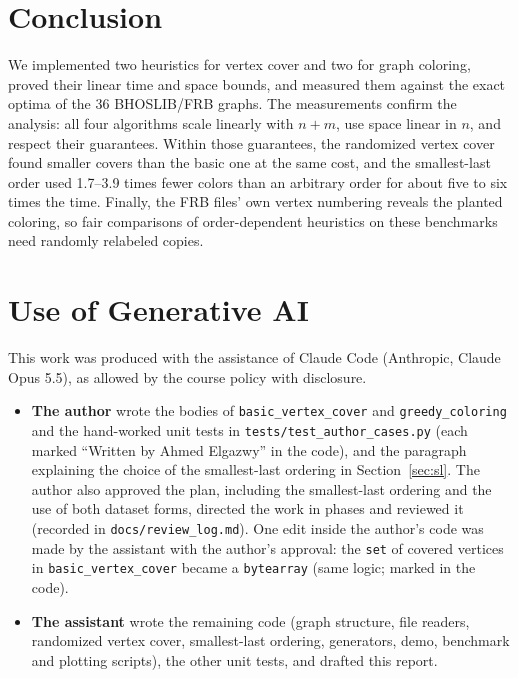 \documentclass[acmsmall,nonacm]{acmart}
\newcommand{\code}[1]{\texttt{#1}}
\begin{document}
\section{Conclusion}

We implemented two heuristics for vertex cover and two for graph coloring,
proved their linear time and space bounds, and measured them against the exact
optima of the 36 BHOSLIB/FRB graphs. The measurements confirm the analysis:
all four algorithms scale linearly with $n+m$, use space linear in $n$, and
respect their guarantees. Within those guarantees, the randomized vertex cover
found smaller covers than the basic one at the same cost, and the
smallest-last order used 1.7--3.9 times fewer colors than an arbitrary order
for about five to six times the time. Finally, the FRB files' own vertex numbering
reveals the planted coloring, so fair comparisons of order-dependent
heuristics on these benchmarks need randomly relabeled copies.

\section*{Use of Generative AI}

This work was produced with the assistance of Claude Code (Anthropic, Claude
Opus 5.5), as allowed by the course policy with disclosure.
\begin{itemize}
  \item \textbf{The author} wrote the bodies of \code{basic\_vertex\_cover} and \code{greedy\_coloring} and the hand-worked unit tests in \code{tests/test\_author\_cases.py} (each marked ``Written by Ahmed Elgazwy'' in the code), and the paragraph explaining the choice of the smallest-last ordering in Section~\ref{sec:sl}. The author also approved the plan, including the smallest-last ordering and the use of both dataset forms, directed the work in phases and reviewed it (recorded in \code{docs/review\_log.md}). One edit inside the author's code was made by the assistant with the author's approval: the \code{set} of covered vertices in \code{basic\_vertex\_cover} became a \code{bytearray} (same logic; marked in the code).
  \item \textbf{The assistant} wrote the remaining code (graph structure, file readers, randomized vertex cover, smallest-last ordering, generators, demo, benchmark and plotting scripts), the other unit tests, and drafted this report.
\end{itemize}



\end{document}
